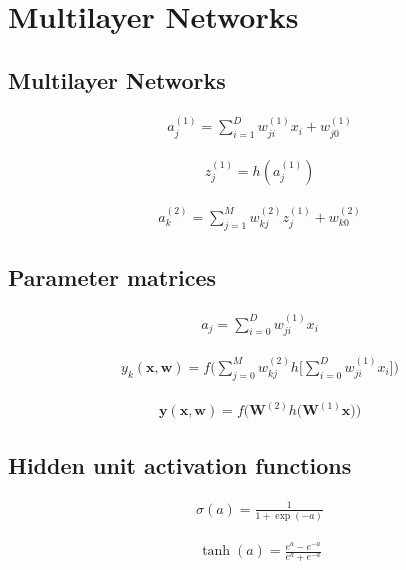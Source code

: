 \documentclass{article}
\begin{document}
\section{Multilayer Networks}

\subsection{Multilayer Networks}

\begin{align*}
a_{j}^{(1)}=\sum_{i=1}^{D} w_{j i}^{(1)} x_{i}+w_{j 0}^{(1)} 
\tag{6.7}
\end{align*}

\begin{align*}
z_{j}^{(1)}=h\left(a_{j}^{(1)}\right) 
\tag{6.8}
\end{align*}

\begin{align*}
a_{k}^{(2)}=\sum_{j=1}^{M} w_{k j}^{(2)} z_{j}^{(1)}+w_{k 0}^{(2)} 
\tag{6.9}
\end{align*}

\subsection{Parameter matrices}

\begin{align*}
a_{j}=\sum_{i=0}^{D} w_{j i}^{(1)} x_{i} 
\tag{6.10}
\end{align*}

\begin{align*}
y_{k}(\mathbf{x}, \mathbf{w})=f\Bigg(\sum_{j=0}^{M} w_{k j}^{(2)} h\bigg[\sum_{i=0}^{D} w_{j i}^{(1)} x_{i}\bigg]\Bigg) 
\tag{6.11}
\end{align*}

\begin{align*}
\mathbf{y}(\mathbf{x}, \mathbf{w})=f\big(\mathbf{W}^{(2)} h\big(\mathbf{W}^{(1)} \mathbf{x}\big)\big) 
\tag{6.12}
\end{align*}

\subsection{Hidden unit activation functions}

\begin{align*}
\sigma(a)=\frac{1}{1+\exp (-a)} 
\tag{6.13}
\end{align*}

\begin{align*}
\tanh (a)=\frac{e^{a}-e^{-a}}{e^{a}+e^{-a}} 
\tag{6.14}
\end{align*}
\end{document}
